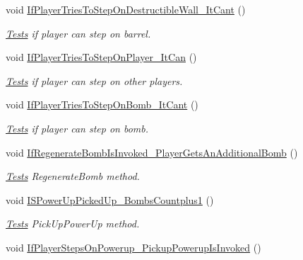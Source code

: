 \begin{DoxyCompactItemize}
void \mbox{\hyperlink{class_bomberman_1_1_business_logic_1_1_tests_1_1_tests_a1511442fcca20dc811901b9f44f94b7d}{If\+Player\+Tries\+To\+Step\+On\+Destructible\+Wall\+\_\+\+It\+Cant}} ()
\begin{DoxyCompactList}\small\item\em \mbox{\hyperlink{class_bomberman_1_1_business_logic_1_1_tests_1_1_tests}{Tests}} if player can step on barrel. \end{DoxyCompactList}\item 
void \mbox{\hyperlink{class_bomberman_1_1_business_logic_1_1_tests_1_1_tests_af8ea94ab53f71c7a17650a886aeadc42}{If\+Player\+Tries\+To\+Step\+On\+Player\+\_\+\+It\+Can}} ()
\begin{DoxyCompactList}\small\item\em \mbox{\hyperlink{class_bomberman_1_1_business_logic_1_1_tests_1_1_tests}{Tests}} if player can step on other players. \end{DoxyCompactList}\item 
void \mbox{\hyperlink{class_bomberman_1_1_business_logic_1_1_tests_1_1_tests_a5f31456cb6dc981fa460b4a172974caf}{If\+Player\+Tries\+To\+Step\+On\+Bomb\+\_\+\+It\+Cant}} ()
\begin{DoxyCompactList}\small\item\em \mbox{\hyperlink{class_bomberman_1_1_business_logic_1_1_tests_1_1_tests}{Tests}} if player can step on bomb. \end{DoxyCompactList}\item 
void \mbox{\hyperlink{class_bomberman_1_1_business_logic_1_1_tests_1_1_tests_aeaa7818b23ce1208980c488c8af6e90a}{If\+Regenerate\+Bomb\+Is\+Invoked\+\_\+\+Player\+Gets\+An\+Additional\+Bomb}} ()
\begin{DoxyCompactList}\small\item\em \mbox{\hyperlink{class_bomberman_1_1_business_logic_1_1_tests_1_1_tests}{Tests}} Regenerate\+Bomb method. \end{DoxyCompactList}\item 
void \mbox{\hyperlink{class_bomberman_1_1_business_logic_1_1_tests_1_1_tests_a4a3dc6bb902a84fccc6eaaffebebeae1}{I\+S\+Power\+Up\+Picked\+Up\+\_\+\+Bombs\+Countplus1}} ()
\begin{DoxyCompactList}\small\item\em \mbox{\hyperlink{class_bomberman_1_1_business_logic_1_1_tests_1_1_tests}{Tests}} Pick\+Up\+Power\+Up method. \end{DoxyCompactList}\item 
void \mbox{\hyperlink{class_bomberman_1_1_business_logic_1_1_tests_1_1_tests_a59522090b27a18e3c30ff129bb651b56}{If\+Player\+Steps\+On\+Powerup\+\_\+\+Pickup\+Powerup\+Is\+Invoked}} ()

\end{DoxyCompactItemize}
